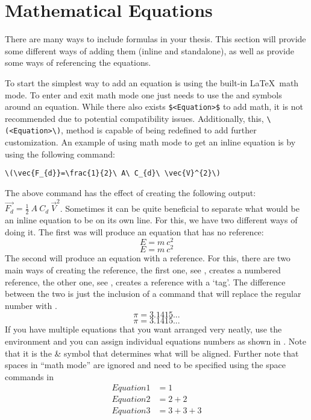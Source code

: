 \chapter{Mathematical Equations}\label{ch:mathematicalequations}
	There are many ways to include formulas in your thesis. 
	This section will provide some different ways of adding them (inline and standalone), as well as provide some ways of referencing the equations.

	To start the simplest way to add an equation is using the built-in \LaTeX\ math mode. 
	To enter and exit math mode one just needs to use the \cmd{(} and \cmd{)} symbols around an equation. While there also exists \lstinline|$<Equation>$| to add math, it is not recommended due to potential compatibility issues. Additionally, this, \lstinline|\(<Equation>\)|, method is capable of being redefined to add further customization. 
	An example of using math mode to get an inline equation is by using the following command:
	\begin{center}
		\lstinline|\(\vec{F_{d}}=\frac{1}{2}\ A\ C_{d}\ \vec{V}^{2}\)|
	\end{center}
	The above command has the effect of creating the following output: \(\vec{F_{d}}=\frac{1}{2}\ A\ C_{d}\ \vec{V}^{2}\).
	Sometimes it can be quite beneficial to separate what would be an inline equation to be on its own line. 
	For this, we have two different ways of doing it. 
	The first was will produce an equation that has no reference:
	\[
		E = m\ c^2
	\] %
	\begin{equation*}
		E = m\ c^2
	\end{equation*}
	The second will produce an equation with a reference. 
	For this, there are two main ways of creating the reference, the first one, see , creates a numbered reference, the other one, see , creates a reference with a `tag'. 
	The difference between the two is just the inclusion of a  command that will replace the regular number with .
	\begin{equation}
		\label{eq:Eq}
		\pi = 3.1415...
	\end{equation}
	\begin{equation}
		\tag{Constant pi}
		\label{eq:customTag}
		\pi = 3.1415...
	\end{equation}
	If you have multiple equations that you want arranged very neatly, use the  environment and you can assign individual equations numbers as shown in .
	Note that it is the \& symbol that determines what will be aligned.
	Further note that spaces in \enquote{math mode} are ignored and need to be specified using the space commands in %
	\begin{align}%
		\label{eq:multiref:a} Equation1 & = 1\\
		\label{eq:multiref:b} Equation2 & = 2 + 2\\
		\label{eq:multiref:c} Equation3 & = 3 + 3 + 3
	\end{align}
	
